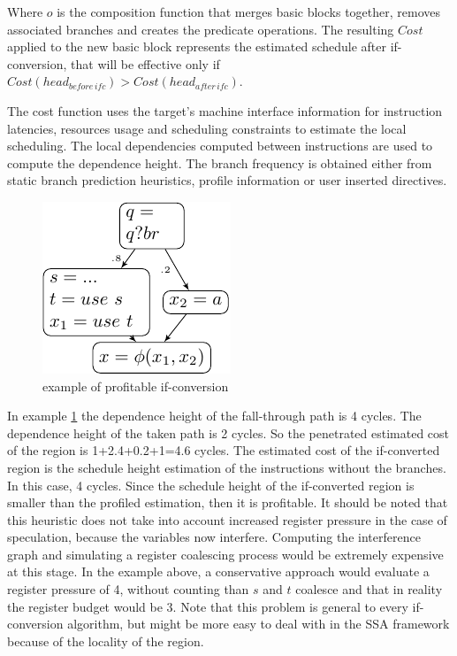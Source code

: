 Where $o$ is the composition function that merges basic blocks together, removes associated branches and creates the predicate operations. The resulting $Cost$ applied to the new basic block represents the estimated schedule after if-conversion, that will be effective only if $Cost(head_{before\,ifc}) > Cost(head_{after\,ifc})$. 
 
The cost function uses the target's machine interface information for instruction latencies, resources usage and scheduling constraints to estimate the local scheduling. The local dependencies computed between instructions are used to compute the dependence height. The branch frequency is obtained either from static branch prediction heuristics, profile information or user inserted directives.
\begin{figure}
    \includegraphics[scale=0.8]{ssa_freq}
\caption{example of profitable if-conversion}
\label{fig:ssa_freq}
\end{figure}

In example \ref{fig:ssa_freq} the dependence height of the fall-through path is 4 cycles. The dependence height of the taken path is 2 cycles. So the penetrated estimated cost of the region is 1+2.4+0.2+1=4.6 cycles. The estimated cost of the if-converted region is the schedule height estimation of the instructions without the branches. In this case, 4 cycles. Since the schedule height of the if-converted region is smaller than the profiled estimation, then it is profitable.
It should be noted that this heuristic does not take into account increased register pressure in the case of speculation, because the variables now interfere. Computing the interference graph and simulating a register coalescing process would be extremely expensive at this stage. In the example above, a conservative approach would evaluate a register pressure of 4, without counting than $s$ and $t$ coalesce and that in reality the register budget would be 3. Note that this problem is general to every if-conversion algorithm, but might be more easy to deal with in the SSA framework because of the locality of the region.

